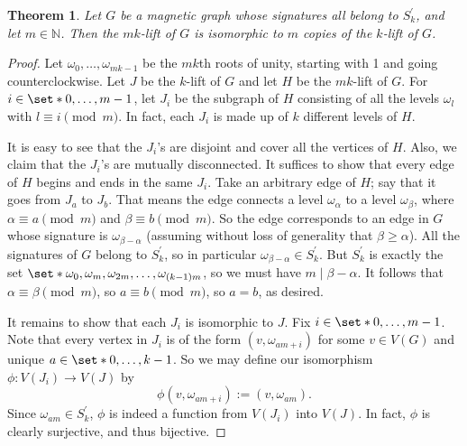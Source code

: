 \documentclass[12pt]{article}
\newtheorem{thm}{Theorem}
\theoremstyle{definition}
\newcommand{\N}{\mathbb N}
\begin{document}
\begin{thm}\label{unnecessarily large lifts}
Let $G$ be a magnetic graph whose signatures all belong to $S^\prime_k$, and let $m \in \N$. Then the $mk$-lift of $G$ is isomorphic to $m$ copies of the $k$-lift of $G$. 
\end{thm}
\begin{proof}
Let $\omega_0, \dots, \omega_{mk-1}$ be the $mk$th roots of unity, starting with 1 and going counterclockwise. Let $J$ be the $k$-lift of $G$ and let $H$ be the $mk$-lift of $G$. For $i \in \set*{0, \dots, m-1}$, let $J_i$ be the subgraph of $H$ consisting of all the levels $\omega_l$ with $l \equiv i \pmod{m}$. In fact, each $J_i$ is made up of $k$ different levels of $H$. 

It is easy to see that the $J_i$'s are disjoint and cover all the vertices of $H$. Also, we claim that the $J_i$'s are mutually disconnected. It suffices to show that every edge of $H$ begins and ends in the same $J_i$. Take an arbitrary edge of $H$; say that it goes from $J_a$ to $J_b$. That means the edge connects a level $\omega_\alpha$ to a level $\omega_\beta$, where $\alpha \equiv a \pmod{m}$ and $\beta \equiv b \pmod{m}$. So the edge corresponds to an edge in $G$ whose signature is $\omega_{\beta-\alpha}$ (assuming  without loss of generality that $\beta \geq \alpha$). All the signatures of $G$ belong to $S^\prime_k$, so in particular $\omega_{\beta-\alpha} \in S^\prime_k$. But $S^\prime_k$ is exactly the set $\set*{\omega_0, \omega_m, \omega_{2m}, \dots, \omega_{(k-1)m}}$, so we must have $m \mid \beta-\alpha$. It follows that $\alpha \equiv \beta \pmod{m}$, so $a \equiv b \pmod{m}$, so $a = b$, as desired.

It remains to show that each $J_i$ is isomorphic to $J$. Fix $i \in \set*{0, \dots, m-1}$. Note that every vertex in $J_i$ is of the form $(v, \omega_{am+i})$ for some $v \in V(G)$ and unique $a \in \set*{0, \dots, k-1}$. So we may define our isomorphism $\phi: V(J_i) \rightarrow V(J)$ by 
$$
\phi(v, \omega_{am+i}) := (v, \omega_{am}).
$$ 
Since $\omega_{am} \in S^\prime_k$, $\phi$ is indeed a function from $V(J_i)$ into $V(J)$. In fact, $\phi$ is clearly surjective, and thus bijective. 


\end{proof}
\end{document}
